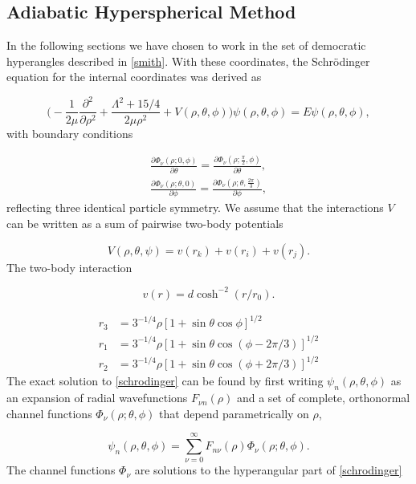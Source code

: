 \documentclass{article}
\numberwithin{equation}{section}
\numberwithin{figure}{section}
\begin{document}
\subsection{Adiabatic Hyperspherical Method}\label{sec:AHM}
In the following sections we have chosen to work in the set of democratic hyperangles described in \ref{smith}. With these coordinates, the Schr{\"o}dinger equation for the internal coordinates was derived as  

\begin{equation}\label{schrodinger}
\Bigg(-\frac{1}{2 \mu}\frac{\partial^2}{ \partial \rho^2} + \frac{\Lambda^2 + 15/4}{2 \mu \rho^2} + V(\rho,\theta,\phi) \Bigg)\psi(\rho,\theta,\phi) = E\psi(\rho,\theta,\phi),
\end{equation}
with boundary conditions

\begin{align}
\frac{\partial\Phi_{\nu}(\rho;0,\phi)}{\partial \theta} = \frac{\partial\Phi_{\nu}(\rho;\frac{\pi}{2},\phi)}{\partial \theta},\\
\frac{\partial\Phi_{\nu}(\rho;\theta,0)}{\partial \phi} = \frac{\partial\Phi_{\nu}(\rho;\theta,\frac{2\pi}{3})}{\partial \phi},
\end{align}
reflecting three identical particle symmetry. We assume that the interactions $V$ can be written as a sum of pairwise two-body potentials   

\begin{equation}
V(\rho,\theta,\psi) = v(r_{k}) + v(r_{i}) + v(r_{j}).
\end{equation}
The two-body interaction 

\begin{equation}
v(r) = d\cosh^{-2}{(r/r_0)}.
\end{equation}

\begin{align}
r_3 &= 3^{-1/4}\rho [1+\sin \theta \cos \phi]^{1/2} \\
r_1 &= 3^{-1/4}\rho [1+\sin \theta \cos (\phi - 2\pi/3)]^{1/2} \\
r_2 &= 3^{-1/4}\rho [1+\sin \theta \cos (\phi + 2\pi/3)]^{1/2} 
\end{align}
The exact solution to \eqref{schrodinger} can be found by first writing $\psi_{n}(\rho,\theta,\phi)$ as an expansion of radial wavefunctions $F_{\nu n}(\rho)$ and a set of complete, orthonormal channel functions $\Phi_{\nu}(\rho;\theta,\phi)$ that depend parametrically on $\rho$,

\begin{equation}\label{wave}
\psi_{n}(\rho,\theta,\phi) = \sum_{\nu=0}^{\infty} F_{n\nu}(\rho)\Phi_{\nu}(\rho;\theta,\phi).
\end{equation}
The channel functions $\Phi_{\nu}$ are solutions to the hyperangular part of \eqref{schrodinger}
\end{document}
